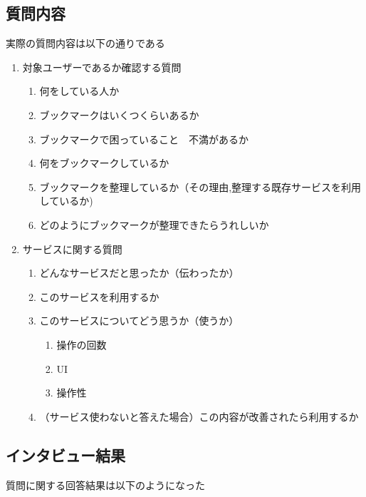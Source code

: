 \documentclass[a4paper,10pt,fleqn]{jsarticle}
\begin{document}
\subsection{質問内容}
実際の質問内容は以下の通りである
\begin{enumerate}
  \item 対象ユーザーであるか確認する質問
  \begin{enumerate}
    \item 何をしている人か
    \item ブックマークはいくつくらいあるか
    \item ブックマークで困っていること　不満があるか
    \item 何をブックマークしているか
    \item ブックマークを整理しているか（その理由,整理する既存サービスを利用しているか)
    \item どのようにブックマークが整理できたらうれしいか
  \end{enumerate}
  \item サービスに関する質問
  \begin{enumerate}
    \item どんなサービスだと思ったか（伝わったか）
    \item このサービスを利用するか
    \item このサービスについてどう思うか（使うか）
    \begin{enumerate}
      \item 操作の回数
      \item UI
      \item 操作性
    \end{enumerate}
    \item （サービス使わないと答えた場合）この内容が改善されたら利用するか
  \end{enumerate}
\end{enumerate}
\subsection{インタビュー結果}
質問に関する回答結果は以下のようになった
\end{document}
